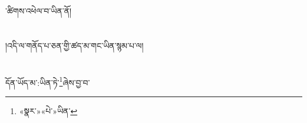 ་ཚིགས་འཕེལ་བ་ཡིན་ནོ།\chapter{ }།འདི་ལ་གནོད་པ་ཅན་གྱི་ཚད་མ་གང་ཡིན་སྙམ་པ་ལ།\chapter{ }དོན་ཡོད་མ་:ཡིན་ཏེ་\footnote{«སྣར་»«པེ་»ཡིན་}ཞེས་བྱ་བ་